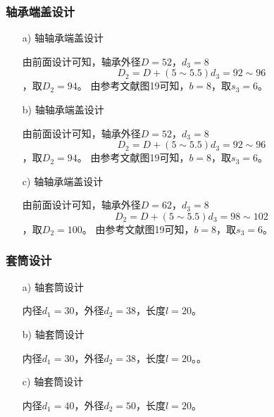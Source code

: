 \subsubsection{轴承端盖设计}
\begin{itemize}
	\item [a)]\uppercase\expandafter{}轴轴承端盖设计
	\par 由前面设计可知，轴承外径$D=52$，$d_3=8$
	$$D_2=D+\left(5\sim 5.5\right)d_3=92\sim 96$$，取$D_2=94$。
	由参考文献\cite{3}图19可知，$b=8$，取$s_3=6$。
	
	\item [b)]\uppercase\expandafter{}轴轴承端盖设计
	\par 由前面设计可知，轴承外径$D=52$，$d_3=8$
	$$D_2=D+\left(5\sim 5.5\right)d_3=92\sim 96$$，取$D_2=94$。
	由参考文献\cite{3}图19可知，$b=8$，取$s_3=6$。 
	
	\item [c)]\uppercase\expandafter{}轴轴承端盖设计
	\par 由前面设计可知，轴承外径$D=62$，$d_3=8$
	$$D_2=D+\left(5\sim 5.5\right)d_3=98\sim 102$$，取$D_2=100$。
	由参考文献\cite{3}图19可知，$b=8$，取$s_3=6$。
\end{itemize}
\subsubsection{套筒设计}
\begin{itemize}
	\item [a)]\uppercase\expandafter{}轴套筒设计
	\par 内径$d_1=30$，外径$d_2=38$，长度$l=20$。	
	   
	\item [b)]\uppercase\expandafter{}轴套筒设计
	\par 内径$d_1=30$，外径$d_2=38$，长度$l=20$。。 
	
	\item [c)]\uppercase\expandafter{}轴套筒设计
	\par 内径$d_1=40$，外径$d_2=50$，长度$l=20$。
\end{itemize}

